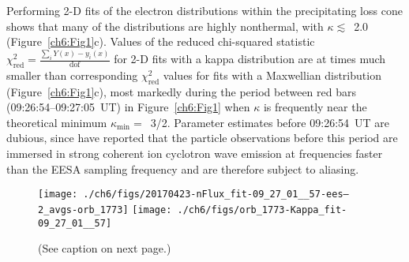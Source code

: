   Performing 2-D fits of the electron distributions within the precipitating
  loss cone shows that many of the distributions are highly nonthermal, with
  $\kappa \lesssim$~2.0 (Figure~\ref{ch6:Fig1}c). Values of the reduced
  chi-squared statistic
  $\chi^2_{\mathrm{red}} = \frac{\sum_i Y(x) - y_i(x)}{\mathrm{dof}}$ for 2-D
  fits with a kappa distribution are at times much smaller than corresponding
  $\chi^2_{\textrm{red}}$ values for fits with a Maxwellian distribution
  (Figure~\ref{ch6:Fig1}c), most markedly during the period between red bars
  (09:26:54--09:27:05~UT) in Figure~\ref{ch6:Fig1} when $\kappa$ is frequently
  near the theoretical minimum $\kappa_{\mathrm{min}} =$~3/2. Parameter
  estimates before 09:26:54~UT are dubious, since \citet{Chaston2002b} have
  reported that the particle observations before this period are immersed in
  strong coherent ion cyclotron wave emission at frequencies faster than the
  EESA sampling frequency and are therefore subject to aliasing.


  \begin{figure}
    \centering
    \noindent\texttt{[image: ./ch6/figs/20170423-nFlux\_fit-09\_27\_01\_\_57-ees--2\_avgs-orb\_1773]}
    \noindent\texttt{[image: ./ch6/figs/orb\_1773-Kappa\_fit-09\_27\_01\_\_57]}
    \caption[Example of one- and two-dimensional fits of observed inverted-V
    electron distributions (Orbit 1773)]{(See caption on next page.)}
    \label{ch6:Fig2}
  \end{figure}

